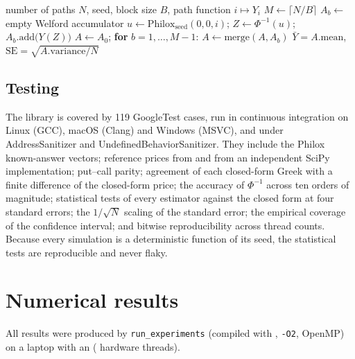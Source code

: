 \documentclass[11pt,a4paper]{article}
\newcommand{\1}{\mathbf{1}}
\theoremstyle{plain}
\theoremstyle{remark}
\begin{document}
\begin{algorithm}[ht]
\caption{Deterministic parallel Monte Carlo estimator}\label{alg:mc}
\begin{algorithmic}[1]
\Require number of paths $N$, seed, block size $B$, path function $i \mapsto Y_i$
\State $M \gets \lceil N/B \rceil$
 
  \State $A_b \gets$ empty Welford accumulator
    \State $u \gets \mathrm{Philox}_{\text{seed}}(0, 0, i)$; \; $Z \gets \Phi^{-1}(u)$; \; $A_b.\mathrm{add}\big(Y(Z)\big)$
  \EndFor
\EndParFor
\State $A \gets A_0$; \textbf{for} $b = 1, \dots, M-1$: $A \gets \mathrm{merge}(A, A_b)$ 
\State \Return $\bar Y = A.\mathrm{mean}$, \; $\mathrm{SE} = \sqrt{A.\mathrm{variance}/N}$
\end{algorithmic}
\end{algorithm}

\subsection{Testing}

The library is covered by 119 GoogleTest cases, run in continuous integration on Linux (GCC), macOS (Clang)
and Windows (MSVC), and under AddressSanitizer and UndefinedBehaviorSanitizer. They include the Philox
known-answer vectors; reference prices from \citet{hull2018} and from an independent SciPy implementation;
put--call parity; agreement of each closed-form Greek with a finite difference of the closed-form price; the
accuracy of $\Phi^{-1}$ across ten orders of magnitude; statistical tests of every estimator against the closed
form at four standard errors; the $1/\sqrt{N}$ scaling of the standard error; the empirical coverage of the
confidence interval; and bitwise reproducibility across thread counts. Because every simulation is a
deterministic function of its seed, the statistical tests are reproducible and never flaky.

\section{Numerical results}\label{sec:results}

All results were produced by \texttt{run\_experiments} (compiled with \CompilerName{}, \texttt{-O2}, OpenMP)
on a laptop with an \CPUName{} (\ThreadsMax{} hardware threads).
\end{document}
